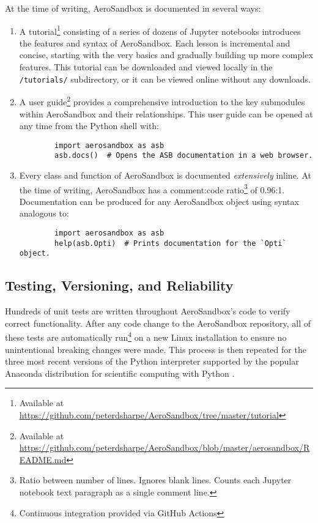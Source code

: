 At the time of writing, AeroSandbox is documented in several ways:
\begin{enumerate}
    \item A tutorial\footnote{Available at \url{https://github.com/peterdsharpe/AeroSandbox/tree/master/tutorial}} consisting of a series of dozens of Jupyter notebooks introduces the features and syntax of AeroSandbox. Each lesson is incremental and concise, starting with the very basics and gradually building up more complex features. This tutorial can be downloaded and viewed locally in the \texttt{/tutorials/} subdirectory, or it can be viewed online without any downloads.
    \item A user guide\footnote{Available at \url{https://github.com/peterdsharpe/AeroSandbox/blob/master/aerosandbox/README.md}} provides a comprehensive introduction to the key submodules within AeroSandbox and their relationships. This user guide can be opened at any time from the Python shell with:
    \begin{verbatim}
        import aerosandbox as asb
        asb.docs()  # Opens the ASB documentation in a web browser.
    \end{verbatim}
    \item Every class and function of AeroSandbox is documented \textit{extensively} inline. At the time of writing, AeroSandbox has a comment:code ratio\footnote{Ratio between number of lines. Ignores blank lines. Counts each Jupyter notebook text paragraph as a single comment line.} of 0.96:1. Documentation can be produced for any AeroSandbox object using syntax analogous to:
    \begin{verbatim}
        import aerosandbox as asb
        help(asb.Opti)  # Prints documentation for the `Opti` object.
    \end{verbatim}
\end{enumerate}

\subsection{Testing, Versioning, and Reliability}
\label{sect:testing}

Hundreds of unit tests are written throughout AeroSandbox's code to verify correct functionality. After any code change to the AeroSandbox repository, all of these tests are automatically run\footnote{Continuous integration provided via GitHub Actions} on a new Linux installation to ensure no unintentional breaking changes were made. This process is then repeated for the three most recent versions of the Python interpreter supported by the popular Anaconda distribution for scientific computing with Python \cite{anaconda}.

